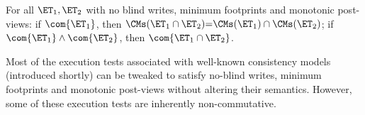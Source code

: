 
\begin{theorem}[Compositionality]  
\label{thm:compositional}   
For all $\ET_1, \ET_2$ with no blind writes, minimum footprints and monotonic post-views: 
if $\com{\ET_1}$, 
then $\CMs(\ET_1 \cap \ET_2) {=} \CMs(\ET_1) \cap \CMs(\ET_2)$;
if $\com{\ET_1} \land \com{\ET_2}$, then $\com{\ET_1 \cap \ET_2}$.
\end{theorem}

Most of the execution tests associated with well-known consistency models (introduced shortly)
can be tweaked to satisfy no-blind writes, minimum footprints and monotonic post-views 
without altering their semantics. However, some of these execution tests
are inherently non-commutative.


